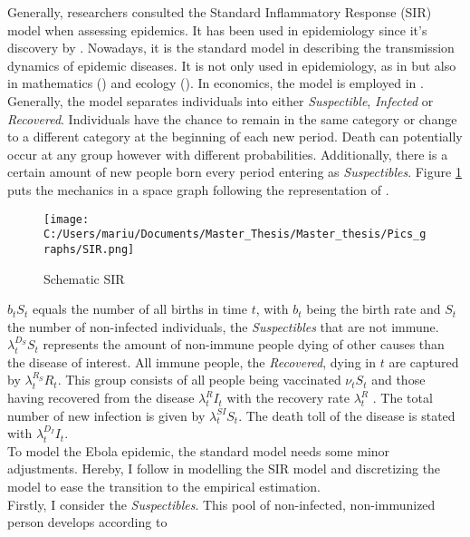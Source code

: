 \documentclass{article}
\begin{document}
Generally, researchers consulted the Standard Inflammatory Response (SIR) model when assessing epidemics. It has been used in epidemiology since it's discovery by \cite{kermack1927contribution}. Nowadays, it is the  standard model in describing the transmission dynamics of epidemic diseases. It is not only used in epidemiology, as in \cite{shulgin1998pulse} but also in mathematics (\cite{mccluskey2010complete})  and ecology (\cite{bjornstad2002dynamics}). In economics, the model is employed in \cite{hansen2017preventing}. \\
Generally, the model separates individuals into either \textit{Suspectible}, \textit{Infected} or \textit{Recovered}. Individuals have the chance to remain in the same category or change to a different category at the beginning of each new period. Death can potentially occur at any group however with different probabilities. Additionally, there is a certain amount of new people born every period entering as \textit{Suspectibles}. Figure \ref{Schematic SIR} puts the mechanics in a space graph following the representation of \cite{bhattacharya2013health}.

\begin{figure}[!ht]
\begin{center}\caption{ Schematic SIR \label{Schematic SIR}}
\texttt{[image: C:/Users/mariu/Documents/Master\_Thesis/Master\_thesis/Pics\_graphs/SIR.png]}\\
\end{center}
\end{figure}

$b_t S_t$ equals the number of all births in time $t$, with $b_t$ being the birth rate and $S_t$ the number of non-infected individuals, the \textit{Suspectibles} that are not immune. $\lambda_t^{D_S} S_t$ represents the amount of non-immune people dying of other causes than the disease of interest. All immune people, the \textit{Recovered}, dying in $t$ are captured by $\lambda_t^{R_S} R_t$. This group consists of all people being vaccinated $\nu_t S_t$ and those having recovered from the disease $\lambda_t^{R} I_t$ with the recovery rate $\lambda_t^{R}$ . The total number of new infection is given by $\lambda_t^{SI} S_t$. The death toll of the disease is stated with $\lambda_t^{D_I} I_t$. \\
To model the Ebola epidemic, the standard model needs some minor adjustments. Hereby, I follow \cite{hansen2017preventing} in modelling the SIR model and discretizing the model to ease the transition to the empirical estimation. \\
Firstly, I consider the \textit{Suspectibles}. This pool of non-infected, non-immunized person develops according to
\end{document}
